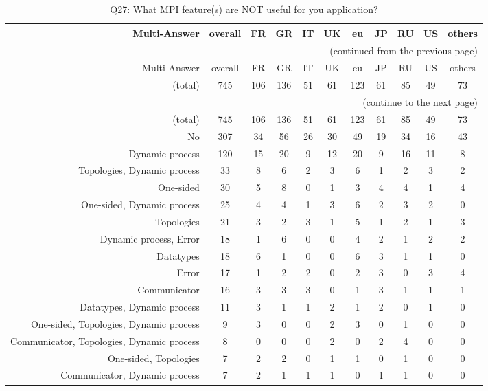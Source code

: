 \clearpage%
{\footnotesize\begin{landscape}%
\begin{longtable}[htb]{r|c|c|c|c|c|c|c|c|c|c}%
\caption{Q27: What MPI feature(s) are NOT useful for you application?}%
\label{tab:Q27-mans} \\%
\hline%
Multi-Answer & overall & FR & GR & IT & UK & eu & JP & RU & US & others \\
 \hline%
\endfirsthead%
\multicolumn{11}{r}{(continued from the previous page)}\\%
\hline%
Multi-Answer & overall & FR & GR & IT & UK & eu & JP & RU & US & others \\
 \hline%
\endhead%
\hline%
(total) & 745 & 106 & 136 & 51 & 61 & 123 & 61 & 85 & 49 & 73 \\%
\hline%
\multicolumn{11}{r}{(continue to the next page)}\\%
\endfoot%
\hline%
(total) & 745 & 106 & 136 & 51 & 61 & 123 & 61 & 85 & 49 & 73 \\%
\hline%
\endlastfoot%
\hline%
{No} & 307 & 34 & 56 & 26 & 30 & 49 & 19 & 34 & 16 & 43 \\%
{Dynamic process} & 120 & 15 & 20 & 9 & 12 & 20 & 9 & 16 & 11 & 8 \\%
{Topologies, Dynamic process} & 33 & 8 & 6 & 2 & 3 & 6 & 1 & 2 & 3 & 2 \\%
{One-sided} & 30 & 5 & 8 & 0 & 1 & 3 & 4 & 4 & 1 & 4 \\%
{One-sided, Dynamic process} & 25 & 4 & 4 & 1 & 3 & 6 & 2 & 3 & 2 & 0 \\%
{Topologies} & 21 & 3 & 2 & 3 & 1 & 5 & 1 & 2 & 1 & 3 \\%
{Dynamic process, Error} & 18 & 1 & 6 & 0 & 0 & 4 & 2 & 1 & 2 & 2 \\%
{Datatypes} & 18 & 6 & 1 & 0 & 0 & 6 & 3 & 1 & 1 & 0 \\%
{Error} & 17 & 1 & 2 & 2 & 0 & 2 & 3 & 0 & 3 & 4 \\%
{Communicator} & 16 & 3 & 3 & 3 & 0 & 1 & 3 & 1 & 1 & 1 \\%
{Datatypes, Dynamic process} & 11 & 3 & 1 & 1 & 2 & 1 & 2 & 0 & 1 & 0 \\%
{One-sided, Topologies, Dynamic process} & 9 & 3 & 0 & 0 & 2 & 3 & 0 & 1 & 0 & 0 \\%
{Communicator, Topologies, Dynamic process} & 8 & 0 & 0 & 0 & 2 & 0 & 2 & 4 & 0 & 0 \\%
{One-sided, Topologies} & 7 & 2 & 2 & 0 & 1 & 1 & 0 & 1 & 0 & 0 \\%
{Communicator, Dynamic process} & 7 & 2 & 1 & 1 & 1 & 0 & 1 & 1 & 0 & 0 \\%

\end{longtable}
\end{landscape}}
